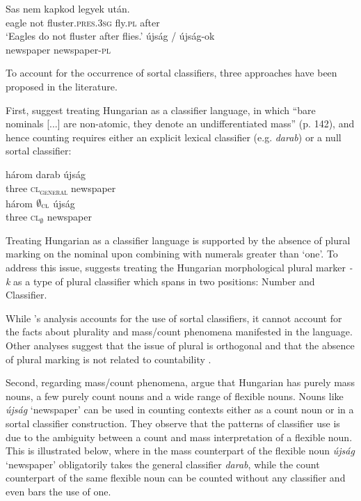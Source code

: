 \documentclass[output=paper]{langscibook}
\begin{document}
\ea \label{schv-nem:ex:4}
\gll Sas nem kapkod legyek után.\\
    eagle not fluster.\textsc{pres}.\textsc{3sg} fly.\textsc{pl}  after\\
\glt `Eagles do not fluster after flies.'
\ex \label{schv-nem:ex:5}
\gll újság / újság-ok\\
   newspaper {} newspaper-\textsc{pl}\\
\z

\noindent To account for the occurrence of sortal classifiers, three approaches have been proposed in the literature.\largerpage[2]

First, \citet{csirmaz-dekany-14} suggest treating Hungarian as a classifier language, in which ``bare nominals [...] are non-atomic, they denote an undifferentiated mass'' (p. 142), and hence counting requires either an explicit lexical classifier (e.g. \textit{darab}) or a null sortal classifier:

\ea \label{schv-nem:ex:6}
\ea \label{schv-nem:ex:6a}
\gll három darab újság\\  
     three \textsc{cl\textsubscript{general}} newspaper\\ 
\ex \label{schv-nem:ex:6b}
\gll három $\emptyset_{\textsc{cl}}$  újság\\
   three \textsc{cl$_{\emptyset}$} newspaper\\
\z
\z

\noindent Treating Hungarian as a classifier language is supported by the absence of plural marking on the nominal upon combining with numerals greater than ‘one’. To address this issue, \citet{dekany-11} suggests treating the Hungarian morphological plural marker \textit{-k} as a type of plural classifier which spans in two positions: Number and Classifier.

While \citeauthor{csirmaz-dekany-14}'s analysis accounts for the use of sortal classifiers, it cannot account for the facts about plurality and mass/count phenomena manifested in the language. Other analyses suggest that the issue of plural is orthogonal and that the absence of plural marking is not related to countability \citep{borer-05, schvarcz-rothstein-17}.

Second, regarding mass/count phenomena, \citet{schvarcz-rothstein-17} argue that  Hungarian has purely mass nouns, a few purely count nouns and a wide range of flexible nouns. Nouns like \textit{újság} `newspaper' can be used in counting contexts either as a count noun or in a sortal classifier construction. They observe that the patterns of classifier use is due to the ambiguity between a count and mass interpretation of a flexible noun. This is illustrated below, where in  the mass counterpart of the flexible noun \textit{újság} `newspaper’ obligatorily takes the general classifier \textit{darab}, while the count counterpart of the same flexible noun  can be counted without any classifier and even bars the use of one. 
\end{document}
